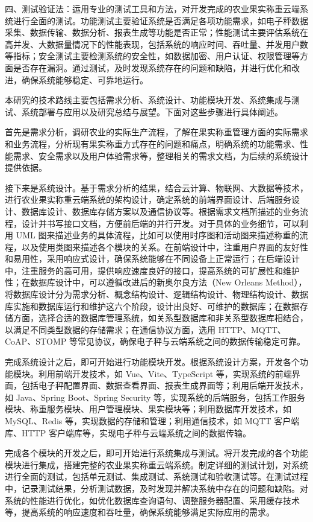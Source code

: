 \documentclass{xduugmr}
\begin{document}
四、测试验证法：运用专业的测试工具和方法，对开发完成的农业果实称重云端系统进行全面的测试。功能测试主要验证系统是否满足各项功能需求，如电子秤数据采集、数据传输、数据分析、报表生成等功能是否正常；性能测试主要评估系统在高并发、大数据量情况下的性能表现，包括系统的响应时间、吞吐量、并发用户数等指标；安全测试主要检测系统的安全性，如数据加密、用户认证、权限管理等方面是否存在漏洞。通过测试，及时发现系统存在的问题和缺陷，并进行优化和改进，确保系统能够稳定、可靠地运行。

本研究的技术路线主要包括需求分析、系统设计、功能模块开发、系统集成与测试、系统部署与应用以及研究总结与展望。下面对这些步骤进行具体阐述。

首先是需求分析，调研农业的实际生产流程，了解在果实称重管理方面的实际需求和业务流程，分析现有果实称重方式存在的问题和痛点，明确系统的功能需求、性能需求、安全需求以及用户体验需求等，整理相关的需求文档，为后续的系统设计提供依据。

接下来是系统设计。基于需求分析的结果，结合云计算、物联网、大数据等技术，进行农业果实称重云端系统的架构设计，确定系统的前端界面设计、后端服务设计、数据库设计、数据库存储方案以及通信协议等。根据需求文档所描述的业务流程，设计并书写接口文档，方便前后端的并行开发。对于具体的业务细节，可以利用 UML 图来描述业务的具体流程，比如可以使用时序图和活动图来描述称重的流程，以及使用类图来描述各个模块的关系。在前端设计中，注重用户界面的友好性和易用性，采用响应式设计，确保系统能够在不同设备上正常运行；在后端设计中，注重服务的高可用，提供响应速度良好的接口，提高系统的可扩展性和维护性；在数据库设计中，可以遵循改进后的新奥尔良方法（New Orleans Method），将数据库设计分为需求分析、概念结构设计、逻辑结构设计、物理结构设计、数据库实施和数据库运行和维护这六个阶段，设计出良好、可维护的数据库\cite{苗雪兰2001数据库系统原理及应用教程}；在数据存储方面，选择合适的数据库管理系统，如关系型数据库和非关系型数据库相结合，以满足不同类型数据的存储需求；在通信协议方面，选用 HTTP、MQTT、CoAP、STOMP 等常见协议，确保电子秤与云端系统之间的数据传输稳定可靠。

完成系统设计之后，即可开始进行功能模块开发。根据系统设计方案，开发各个功能模块。利用前端开发技术，如 Vue、Vite、TypeScript 等，实现系统的前端界面，包括电子秤配置界面、数据查看界面、报表生成界面等；利用后端开发技术，如 Java、Spring Boot、Spring Security 等，实现系统的后端服务，包括工作服务模块、称重服务模块、用户管理模块、果实模块等；利用数据库开发技术，如 MySQL、Redis 等，实现数据的存储和管理；利用通信技术，如 MQTT 客户端库、HTTP 客户端库等，实现电子秤与云端系统之间的数据传输。

完成各个模块的开发之后，即可开始进行系统集成与测试。将开发完成的各个功能模块进行集成，搭建完整的农业果实称重云端系统。制定详细的测试计划，对系统进行全面的测试，包括单元测试、集成测试、系统测试和验收测试等。在测试过程中，记录测试结果，分析测试数据，及时发现并解决系统中存在的问题和缺陷。对系统的性能进行优化，如优化数据库查询语句、调整服务器配置、采用缓存技术等，提高系统的响应速度和吞吐量，确保系统能够满足实际应用的需求。
\end{document}
